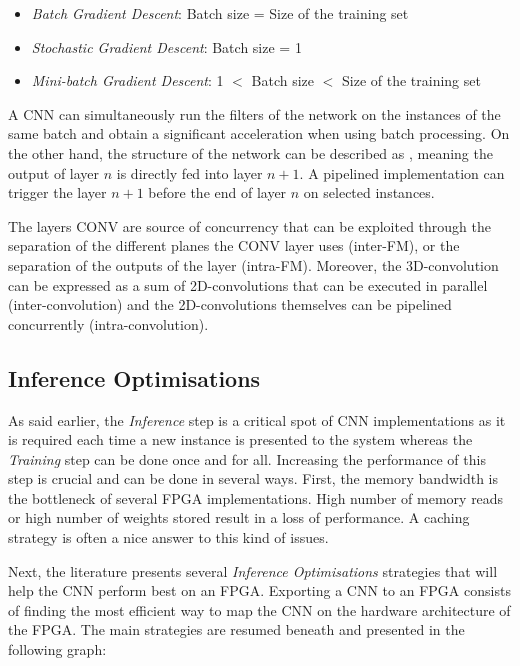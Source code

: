\begin{itemize}
	\item \emph{Batch Gradient Descent}: Batch size = Size of the training set
	\item \emph{Stochastic Gradient Descent}: Batch size = 1
	\item \emph{Mini-batch Gradient Descent}: 1 $<$ Batch size $<$ Size of the training set
\end{itemize}

A CNN can simultaneously run the filters of the network on the instances of the same batch and obtain a significant acceleration when using batch processing. On the other hand, the structure of the network can be described as , meaning the output of layer $n$ is directly fed into layer $n+1$. A pipelined implementation can trigger the layer $n+1$ before the end of layer $n$ on selected instances.

The layers CONV are source of concurrency that can be exploited through the separation of the different planes the CONV layer uses (inter-FM), or the separation of the outputs of the layer (intra-FM). Moreover, the 3D-convolution can be expressed as a sum of 2D-convolutions that can be executed in parallel (inter-convolution) and the 2D-convolutions themselves can be pipelined concurrently (intra-convolution).


\subsection{Inference Optimisations}

As said earlier, the \emph{Inference} step is a critical spot of CNN implementations as it is required each time a new instance is presented to the system whereas the \emph{Training} step can be done once and for all. Increasing the performance of this step is crucial and can be done in several ways. First, the memory bandwidth is the bottleneck of several FPGA implementations. High number of memory reads or high number of weights stored result in a loss of performance. A caching strategy is often a nice answer to this kind of issues.

Next, the literature presents several \emph{Inference Optimisations} strategies that will help the CNN perform best on an FPGA. Exporting a CNN to an FPGA consists of finding the most efficient way to map the CNN on the hardware architecture of the FPGA. The main strategies are resumed beneath and presented in the following graph:

